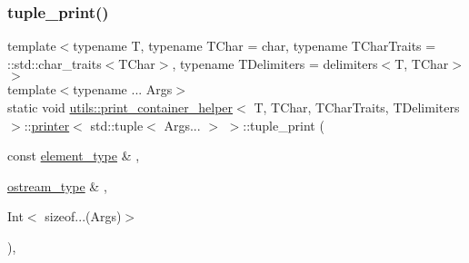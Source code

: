 \subsubsection{\texorpdfstring{tuple\_print()}{tuple\_print()}\hspace{0.1cm}{\footnotesize\ttfamily [1/3]}}
{\footnotesize\ttfamily template$<$typename T, typename T\+Char = char, typename T\+Char\+Traits = \+::std\+::char\+\_\+traits$<$\+T\+Char$>$, typename T\+Delimiters = delimiters$<$\+T, T\+Char$>$$>$ \\
template$<$typename ... Args$>$ \\
static void \mbox{\hyperlink{structutils_1_1print__container__helper}{utils\+::print\+\_\+container\+\_\+helper}}$<$ T, T\+Char, T\+Char\+Traits, T\+Delimiters $>$\+::\mbox{\hyperlink{structutils_1_1print__container__helper_1_1printer}{printer}}$<$ std\+::tuple$<$ Args... $>$ $>$\+::tuple\+\_\+print (\begin{DoxyParamCaption}\item[{const \mbox{\hyperlink{structutils_1_1print__container__helper_1_1printer_3_01std_1_1tuple_3_01_args_8_8_8_01_4_01_4_a1ca86cb16c37518fb257879ce8026459}{element\+\_\+type}} \&}]{,  }\item[{\mbox{\hyperlink{structutils_1_1print__container__helper_1_1printer_3_01std_1_1tuple_3_01_args_8_8_8_01_4_01_4_a7a89933fa31d7a79f454cdf36211a73a}{ostream\+\_\+type}} \&}]{,  }\item[{Int$<$ sizeof...(Args)$>$}]{ }\end{DoxyParamCaption})\hspace{0.3cm}{\ttfamily [inline]}, {\ttfamily [static]}}

\mbox{\label{structutils_1_1print__container__helper_1_1printer_3_01std_1_1tuple_3_01_args_8_8_8_01_4_01_4_a035a8325caf8476f25935e077862a4c8}} 
